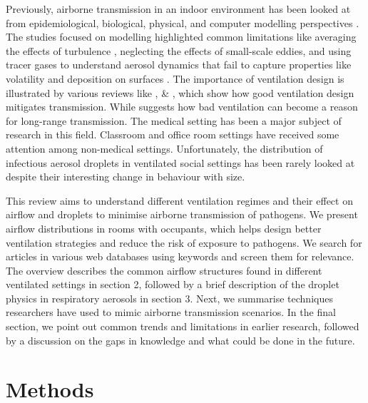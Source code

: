 \documentclass[preprint,12pt]{elsarticle}
\begin{document}
Previously, airborne transmission in an indoor environment has been looked at from epidemiological, biological, physical, and computer modelling perspectives \cite{argyropoulos2023airborne}. The studies focused on modelling highlighted common limitations like averaging the effects of turbulence \cite{mirzaie2021covid,dbouk2020respiratory},  neglecting the effects of small-scale eddies, and using tracer gases to understand aerosol dynamics that fail to capture properties like volatility and deposition on surfaces \cite{rayegan2022review, zhao2022airborne}. The importance of ventilation design is illustrated by various reviews like \cite{luongo2016role}, \cite{hobeika2023assessing} \& \cite{thornton2022impact}, which show how good ventilation design mitigates transmission. While \cite{correia2020airborne} suggests how bad ventilation can become a reason for long-range transmission. The medical setting has been a major subject of research in this field. Classroom and office room settings have received some attention among non-medical settings. Unfortunately, the distribution of infectious aerosol droplets in ventilated social settings has been rarely looked at despite their interesting change in behaviour with size.

This review aims to understand different ventilation regimes and their effect on airflow and droplets to minimise airborne transmission of pathogens. We present airflow distributions in rooms with occupants, which helps design better ventilation strategies and reduce the risk of exposure to pathogens. We search for articles in various web databases using keywords and screen them for relevance. The overview describes the common airflow structures found in different ventilated settings in section 2, followed by a brief description of the droplet physics in respiratory aerosols in section 3. Next, we summarise techniques researchers have used to mimic airborne transmission scenarios. In the final section, we point out common trends and limitations in earlier research, followed by a discussion on the gaps in knowledge and what could be done in the future.

\section{Methods}
\end{document}
